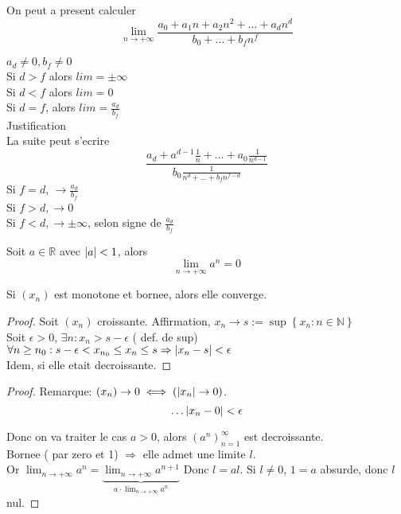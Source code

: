 \documentclass[../main.tex]{subfiles}
\begin{document}
\begin{exemple}
On peut a present calculer
\[ 
	\lim_{n \to  + \infty} \frac{a_0+a_1n+a_2n^{2}+ \ldots + a_d n^{d}}{b_0+\ldots + b_f n^{f}}
\]

$a_d \neq 0, b_f \neq 0$ \\
Si $d >f$ alors $ lim = \pm \infty $\\
Si $d<f$ alors $lim =0$ \\

Si $d=f$, alors $lim= \frac{a_d}{b_f}$\\
Justification\\
La suite peut s'ecrire
\[ 
\frac{a_d + a^{d-1} \frac{1}{n} + \ldots + a_0 \frac{1}{n^{d-1} }}{b_0 \frac{1}{n^{d} + \ldots + b_f n^{f-d}}}
\]
Si $f=d$, $\to \frac{a_d}{b_f}$ \\

Si $f>d ,\to 0$\\
Si  $f<d, \to \pm \infty $, selon signe de $\frac{a_d}{b_f}$

\end{exemple}
\begin{propo}
	Soit $a\in \mathbb{R}$ avec $\left\vert a\right\vert < 1$, alors
	\[ 
	\lim_{n \to  + \infty} a^{n} =0
	\]
	
\end{propo}
\begin{propo}
	Si $(x_n)$ est monotone et bornee, alors elle converge.
\end{propo}
\begin{proof}
	Soit $(x_n)$ croissante. Affirmation, $x_n \to s := \sup \left\{ x_n: n \in \mathbb{N} \right\} $\\
	Soit $\epsilon >0$, $\exists n: x_n >s- \epsilon$ ( def. de sup)\\
	$\forall n \geq n_0 :s-\epsilon <x_{n_0} \leq x_n \leq s \Rightarrow \left\vert x_n -s\right\vert < \epsilon $\\
	Idem, si elle etait decroissante.
\end{proof}
\begin{proof}
	Remarque: $(x_n) \to 0 \iff ( \left\vert x_n\right\vert \to 0)$.\\
	\[ 
		\ldots \left\vert x_n-0\right\vert < \epsilon
	\]
	
	Donc on va traiter le cas $a>0$, alors $(a^{n})_{n=1} ^{\infty }$ est decroissante.\\
	Bornee ( par zero et 1) $\Rightarrow$ elle admet une limite $l$.\\
	Or $\lim_{n \to  + \infty} a^{n} = \underbrace{\lim_{n \to  + \infty} a^{n+1}}_{a \cdot \lim_{n \to  + \infty} a^{n}}$
	Donc $l=al$.
	Si $l\neq 0$, $1=a$ absurde, donc $l$ nul.
\end{proof}
\end{document}
